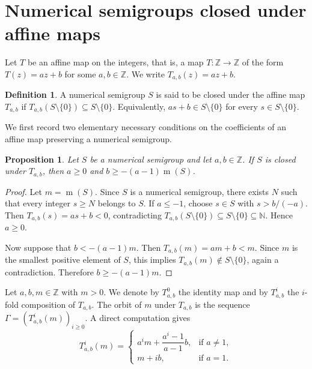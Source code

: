 \documentclass[12pt,a4paper]{amsart}
\newtheorem{proposition}[theorem]{Proposition}
\theoremstyle{definition}
\newtheorem{definition}[theorem]{Definition}
\begin{document}
\section{Numerical semigroups closed under affine maps}\label{Sect:2}

Let $T$ be an affine map on the integers, that is, a map
$T:\mathbb{Z}\to\mathbb{Z}$ of the form $T(z)=az+b$ for some
$a,b\in\mathbb{Z}$. We write $T_{a,b}(z)=az+b$.

\begin{definition}
A numerical semigroup $S$ is said to be closed under the affine map
$T_{a,b}$ if $T_{a,b}(S\setminus\{0\})\subseteq S\setminus\{0\}$.
Equivalently, $as+b\in S\setminus\{0\}$ for every
$s\in S\setminus\{0\}$.
\end{definition}

We first record two elementary necessary conditions on the coefficients
of an affine map preserving a numerical semigroup.

\begin{proposition}
Let $S$ be a numerical semigroup and let $a,b\in\mathbb{Z}$. If $S$ is closed under $T_{a,b}$, then $a\ge 0$ and $b\ge -(a-1)\operatorname{m}(S)$.
\end{proposition}

\begin{proof}
Let $m=\operatorname{m}(S)$. Since $S$ is a numerical semigroup, there
exists $N$ such that every integer $s\ge N$ belongs to $S$. If
$a\le -1$, choose $s\in S$ with $s>b/(-a)$. Then
$T_{a,b}(s)=as+b<0$, contradicting
$T_{a,b}(S\setminus\{0\})\subseteq S\setminus\{0\}\subseteq\mathbb{N}$.
Hence $a\ge 0$.

Now suppose that $b<-(a-1)m$. Then $T_{a,b}(m)=am+b<m$. Since $m$ is
the smallest positive element of $S$, this implies
$T_{a,b}(m)\notin S\setminus\{0\}$, again a contradiction. Therefore
$b\ge -(a-1)m$.
\end{proof}

Let $a,b,m\in\mathbb{Z}$ with $m>0$. We denote by $T^0_{a,b}$ the
identity map and by $T^i_{a,b}$ the $i$-fold composition of $T_{a,b}$.
The orbit of $m$ under $T_{a,b}$ is the sequence
$\Gamma=(T^i_{a,b}(m))_{i\ge 0}$. A direct computation gives
\[
T^i_{a,b}(m)=
\begin{cases}
a^im+\dfrac{a^i-1}{a-1}b, & \text{if } a\ne 1,\\[8pt]
m+ib, & \text{if } a=1.
\end{cases}
\]
\end{document}
